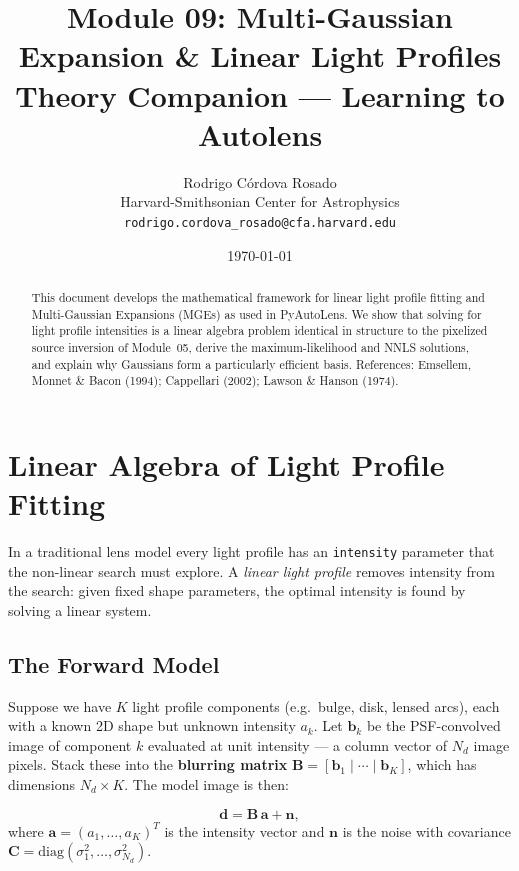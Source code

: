 \documentclass[11pt, letterpaper]{article}
\title{\textbf{Module 09: Multi-Gaussian Expansion \& Linear Light Profiles}\\[0.5em]
\large Theory Companion --- Learning to Autolens}
\author{Rodrigo C\'ordova Rosado\\
\small Harvard-Smithsonian Center for Astrophysics\\
\small \texttt{rodrigo.cordova\_rosado@cfa.harvard.edu}}
\date{\today}
\begin{document}
\maketitle

\begin{abstract}
This document develops the mathematical framework for linear light
profile fitting and Multi-Gaussian Expansions (MGEs) as used in
PyAutoLens.  We show that solving for light profile intensities is
a linear algebra problem identical in structure to the pixelized
source inversion of Module~05, derive the maximum-likelihood and
NNLS solutions, and explain why Gaussians form a particularly
efficient basis.
References: Emsellem, Monnet \& Bacon (1994); Cappellari (2002);
Lawson \& Hanson (1974).
\end{abstract}

\tableofcontents
\newpage

\section{Linear Algebra of Light Profile Fitting}
\label{sec:linear-algebra}

In a traditional lens model every light profile has an \texttt{intensity}
parameter that the non-linear search must explore.  A \emph{linear light
profile} removes intensity from the search: given fixed shape parameters,
the optimal intensity is found by solving a linear system.

\subsection{The Forward Model}

Suppose we have $K$ light profile components (e.g.\ bulge, disk, lensed
arcs), each with a known 2D shape but unknown intensity $a_k$.  Let
$\mathbf{b}_k$ be the PSF-convolved image of component $k$ evaluated at
unit intensity --- a column vector of $N_d$ image pixels.  Stack these
into the \textbf{blurring matrix}
$\mathbf{B} = [\mathbf{b}_1 \mid \cdots \mid \mathbf{b}_K]$, which has
dimensions $N_d \times K$.  The model image is then:

\begin{keyresult}[title={Forward Model}]
\begin{equation}
  \mathbf{d} = \mathbf{B}\,\mathbf{a} + \mathbf{n},
  \label{eq:forward}
\end{equation}
where $\mathbf{a} = (a_1,\ldots,a_K)^T$ is the intensity vector and
$\mathbf{n}$ is the noise with covariance
$\mathbf{C} = \mathrm{diag}(\sigma_1^2,\ldots,\sigma_{N_d}^2)$.
\end{keyresult}
\end{document}
